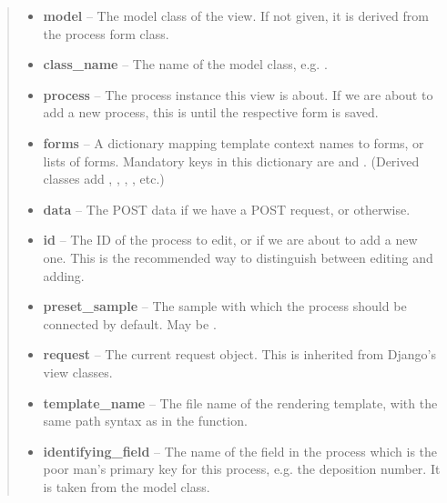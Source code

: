 \documentclass[a4paper,11pt,english]{sphinxmanual}
\begin{document}
\begin{fulllineitems}
\begin{quote}
\begin{description}
\begin{itemize}
\item {} 
\textbf{model} -- The model class of the view.  If not given, it is derived from
the process form class.

\item {} 
\textbf{class\_name} -- The name of the model class,
e.g. .

\item {} 
\textbf{process} -- The process instance this view is about.  If we are about to
add a new process, this is  until the respective form is saved.

\item {} 
\textbf{forms} -- A dictionary mapping template context names to forms, or lists
of forms.  Mandatory keys in this dictionary are  and
.  (Derived classes add ,
, , , etc.)

\item {} 
\textbf{data} -- The POST data if we have a POST request, or  otherwise.

\item {} 
\textbf{id} -- The ID of the process to edit, or  if we are about to add
a new one.  This is the recommended way to distinguish between editing
and adding.

\item {} 
\textbf{preset\_sample} -- The sample with which the process should be connected
by default.  May be .

\item {} 
\textbf{request} -- The current request object.  This is inherited from Django's
view classes.

\item {} 
\textbf{template\_name} -- The file name of the rendering template, with the same
path syntax as in the  function.

\item {} 
\textbf{identifying\_field} -- The name of the field in the process which is the
poor man's primary key for this process, e.g. the deposition number.  It
is taken from the model class.

\end{itemize}

\end{description}\end{quote}


\end{fulllineitems}
\end{document}
